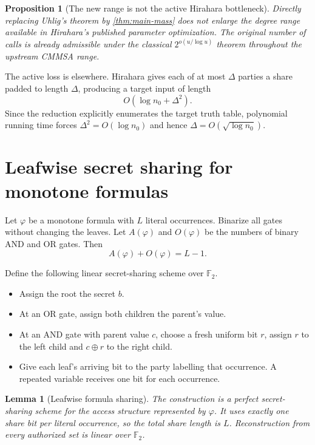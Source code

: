 \documentclass[11pt]{article}
\newtheorem{lemma}[theorem]{Lemma}
\newtheorem{proposition}[theorem]{Proposition}
\theoremstyle{definition}
\newcommand{\F}{\mathbb{F}}
\newcommand{\xor}{\mathbin{\oplus}}
\begin{document}
\begin{proposition}[The new range is not the active Hirahara bottleneck]\label{prop:hirahara-not-active}
Directly replacing Uhlig's theorem by \cref{thm:main-mass} does not enlarge the degree range available in Hirahara's published parameter optimization.  The original number of calls is already admissible under the classical $2^{o(u/\log u)}$ theorem throughout the upstream CMMSA range.
\end{proposition}

The active loss is elsewhere.  Hirahara gives each of at most $\Delta$ parties a share padded to length $\Delta$, producing a target input of length
\[
 O(\log n_0+\Delta^2).
\]
Since the reduction explicitly enumerates the target truth table, polynomial running time forces $\Delta^2=O(\log n_0)$ and hence $\Delta=O(\sqrt{\log n_0})$.

\section{Leafwise secret sharing for monotone formulas}

Let $\varphi$ be a monotone formula with $L$ literal occurrences.  Binarize all gates without changing the leaves.  Let $A(\varphi)$ and $O(\varphi)$ be the numbers of binary AND and OR gates.  Then
\begin{equation}\label{eq:tree-count}
 A(\varphi)+O(\varphi)=L-1.
\end{equation}

Define the following linear secret-sharing scheme over $\F_2$.

\begin{itemize}
\item Assign the root the secret $b$.
\item At an OR gate, assign both children the parent's value.
\item At an AND gate with parent value $c$, choose a fresh uniform bit $r$, assign $r$ to the left child and $c\xor r$ to the right child.
\item Give each leaf's arriving bit to the party labelling that occurrence.  A repeated variable receives one bit for each occurrence.
\end{itemize}

\begin{lemma}[Leafwise formula sharing]\label{lem:leaf-sharing}
The construction is a perfect secret-sharing scheme for the access structure represented by $\varphi$.  It uses exactly one share bit per literal occurrence, so the total share length is $L$.  Reconstruction from every authorized set is linear over $\F_2$.
\end{lemma}
\end{document}
